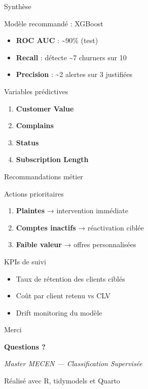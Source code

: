 \documentclass[
  10pt,
  ignorenonframetext,
  aspectratio=169,
]{beamer}
\providecommand{\tightlist}{%
  \setlength{\itemsep}{0pt}\setlength{\parskip}{0pt}}\usepackage{longtable,booktabs,array}
\begin{document}
\begin{frame}{Synthèse}
\label{synthuxe8se}
\begin{block}{Modèle recommandé : XGBoost}
\label{moduxe8le-recommanduxe9-xgboost}
\begin{itemize}
\tightlist
\item
  \textbf{ROC AUC} : \textasciitilde90\% (test)
\item
  \textbf{Recall} : détecte \textasciitilde7 churners sur 10
\item
  \textbf{Precision} : \textasciitilde2 alertes sur 3 justifiées
\end{itemize}
\end{block}

\begin{block}{Variables prédictives}
\label{variables-pruxe9dictives}
\begin{enumerate}
\tightlist
\item
  \textbf{Customer Value}
\item
  \textbf{Complains}
\item
  \textbf{Status}
\item
  \textbf{Subscription Length}
\end{enumerate}
\end{block}
\end{frame}

\begin{frame}{Recommandations métier}
\label{recommandations-muxe9tier}
\begin{block}{Actions prioritaires}
\label{actions-prioritaires}
\begin{enumerate}
\tightlist
\item
  \textbf{Plaintes} → intervention immédiate
\item
  \textbf{Comptes inactifs} → réactivation ciblée
\item
  \textbf{Faible valeur} → offres personnalisées
\end{enumerate}
\end{block}

\begin{block}{KPIs de suivi}
\label{kpis-de-suivi}
\begin{itemize}
\tightlist
\item
  Taux de rétention des clients ciblés
\item
  Coût par client retenu vs CLV
\item
  Drift monitoring du modèle
\end{itemize}
\end{block}
\end{frame}

\begin{frame}{Merci}
\label{merci}
\vspace{1cm}
\centering

\textbf{Questions ?}

\vspace{0.5cm}

\emph{Master MECEN --- Classification Supervisée}

\vspace{1cm}
\footnotesize

Réalisé avec R, tidymodels et Quarto
\end{frame}
\end{document}
